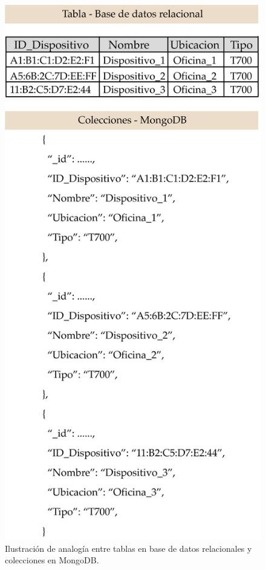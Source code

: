 \begin{figure}[htpb]
	\centering
	\includegraphics[scale=.75]{./Figures/tabla-coleccion.png}
	\caption[Comparación tabla - colecciones en MongoDB ]{Ilustración de analogía entre tablas en base de datos relacionales y colecciones en MongoDB.}
	\label{fig:tabla-coleccion}
\end{figure}




